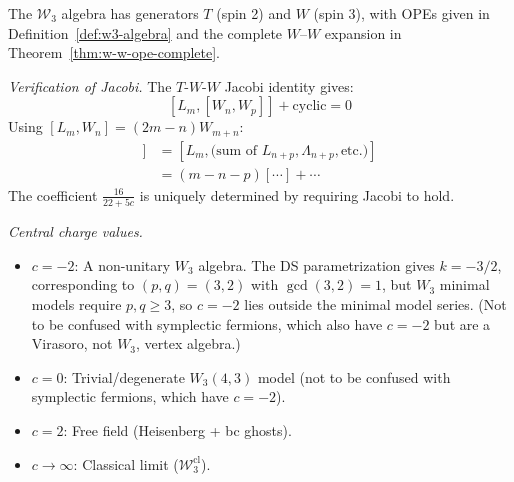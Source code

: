 \begin{computation}The $\mathcal{W}_3$ algebra has generators $T$ (spin 2) and $W$ (spin 3), with OPEs given in Definition~\ref{def:w3-algebra} and the complete $W$--$W$ expansion in Theorem~\ref{thm:w-w-ope-complete}.

\emph{Verification of Jacobi.} The $T$-$W$-$W$ Jacobi identity gives:
\[
[L_m, [W_n, W_p]] + \text{cyclic} = 0
\]
Using $[L_m, W_n] = (2m - n)W_{m+n}$:
\begin{align*}
[L_m, [W_n, W_p]] &= [L_m, \text{(sum of } L_{n+p}, \Lambda_{n+p}, \text{etc.)}] \\
&= (m - n - p)[\cdots] + \cdots
\end{align*}
The coefficient $\frac{16}{22+5c}$ is uniquely determined by requiring Jacobi to hold.

\emph{Central charge values.}
\begin{itemize}
\item $c = -2$: A non-unitary $W_3$ algebra. The DS parametrization gives $k = -3/2$, corresponding to $(p,q) = (3,2)$ with $\gcd(3,2) = 1$, but $W_3$ minimal models require $p, q \geq 3$, so $c = -2$ lies outside the minimal model series. (Not to be confused with symplectic fermions, which also have $c=-2$ but are a Virasoro, not $W_3$, vertex algebra.)
\item $c = 0$: Trivial/degenerate $W_3(4,3)$ model (not to be confused with symplectic fermions, which have $c=-2$).
\item $c = 2$: Free field (Heisenberg + bc ghosts).
\item $c \to \infty$: Classical limit ($\mathcal{W}_3^{\mathrm{cl}}$).
\end{itemize}
\end{computation}


